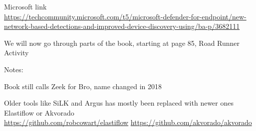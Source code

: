 \documentclass[Screen16to9,17pt]{foils}
\begin{document}
\begin{list2}
\item Microsoft link\\{\scriptsize
\url{https://techcommunity.microsoft.com/t5/microsoft-defender-for-endpoint/new-network-based-detections-and-improved-device-discovery-using/ba-p/3682111}}
\end{list2}



We will now go through parts of the book, starting at page 85, Road Runner Activity

Notes:
\begin{list2}
\item Book still calls Zeek for Bro, name changed in 2018
\item Older tools like SiLK and Argus has mostly been replaced with newer ones Elastiflow or Akvorado\\
\url{https://github.com/robcowart/elastiflow} \url{https://github.com/akvorado/akvorado}
\end{list2}



\end{document}
